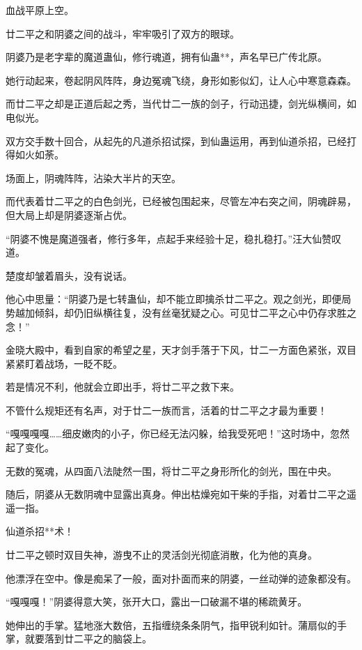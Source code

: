 
\begin{this_body}

血战平原上空。

廿二平之和阴婆之间的战斗，牢牢吸引了双方的眼球。

阴婆乃是老字辈的魔道蛊仙，修行魂道，拥有仙蛊**，声名早已广传北原。

她行动起来，卷起阴风阵阵，身边冤魂飞绕，身形如影似幻，让人心中寒意森森。

而廿二平之却是正道后起之秀，当代廿二一族的剑子，行动迅捷，剑光纵横间，如电似光。

双方交手数十回合，从起先的凡道杀招试探，到仙蛊运用，再到仙道杀招，已经打得如火如荼。

场面上，阴魂阵阵，沾染大半片的天空。

而代表着廿二平之的白色剑光，已经被包围起来，尽管左冲右突之间，阴魂辟易，但大局上却是阴婆逐渐占优。

“阴婆不愧是魔道强者，修行多年，点起手来经验十足，稳扎稳打。”汪大仙赞叹道。

楚度却皱着眉头，没有说话。

他心中思量：“阴婆乃是七转蛊仙，却不能立即擒杀廿二平之。观之剑光，即便局势越加倾斜，却仍旧纵横往复，没有丝毫犹疑之心。可见廿二平之心中仍存求胜之念！”

金晓大殿中，看到自家的希望之星，天才剑手落于下风，廿二一方面色紧张，双目紧紧盯着战场，一眨不眨。

若是情况不利，他就会立即出手，将廿二平之救下来。

不管什么规矩还有名声，对于廿二一族而言，活着的廿二平之才最为重要！

“嘎嘎嘎嘎……细皮嫩肉的小子，你已经无法闪躲，给我受死吧！”这时场中，忽然起了变化。

无数的冤魂，从四面八法陡然一围，将廿二平之身形所化的剑光，围在中央。

随后，阴婆从无数阴魂中显露出真身。伸出枯燥宛如干柴的手指，对着廿二平之遥遥一指。

仙道杀招**术！

廿二平之顿时双目失神，游曳不止的灵活剑光彻底消散，化为他的真身。

他漂浮在空中。像是痴呆了一般，面对扑面而来的阴婆，一丝动弹的迹象都没有。

“嘎嘎嘎！”阴婆得意大笑，张开大口，露出一口破漏不堪的稀疏黄牙。

她伸出的手掌。猛地涨大数倍，五指缠绕条条阴气，指甲锐利如针。蒲扇似的手掌，就要落到廿二平之的脑袋上。


\end{this_body}
